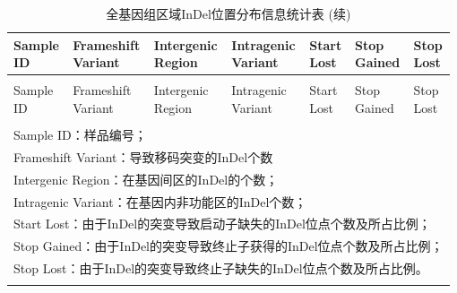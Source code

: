 \documentclass[
  a4paper,
  titlepage]{article}
\begin{document}
\begin{longtable}[t]{lllllll}
\caption{\label{tab:indelannostat-table}全基因组区域InDel位置分布信息统计表}\\
\toprule
\makecell[c]{Sample\\ID} & \makecell[c]{Frameshift\\Variant} & \makecell[c]{Intergenic\\Region} & \makecell[c]{Intragenic\\Variant} & \makecell[c]{Start\\Lost} & \makecell[c]{Stop\\Gained} & \makecell[c]{Stop\\Lost}\\
\midrule
\endfirsthead
\caption[]{\label{tab:indelannostat-table}全基因组区域InDel位置分布信息统计表 (续)}\\
\toprule
\makecell[c]{Sample\\ID} & \makecell[c]{Frameshift\\Variant} & \makecell[c]{Intergenic\\Region} & \makecell[c]{Intragenic\\Variant} & \makecell[c]{Start\\Lost} & \makecell[c]{Stop\\Gained} & \makecell[c]{Stop\\Lost}\\
\midrule
\endhead
\hline
\endfoot
\bottomrule
\multicolumn{7}{l}{\rule{0pt}{1em}\textit{注：}}\\
\multicolumn{7}{l}{\rule{0pt}{1em}Sample ID：样品编号；}\\
\multicolumn{7}{l}{\rule{0pt}{1em}Frameshift Variant：导致移码突变的InDel个数}\\
\multicolumn{7}{l}{\rule{0pt}{1em}Intergenic Region：在基因间区的InDel的个数；}\\
\multicolumn{7}{l}{\rule{0pt}{1em}Intragenic Variant：在基因内非功能区的InDel个数；}\\
\multicolumn{7}{l}{\rule{0pt}{1em}Start Lost：由于InDel的突变导致启动子缺失的InDel位点个数及所占比例；}\\
\multicolumn{7}{l}{\rule{0pt}{1em}Stop Gained：由于InDel的突变导致终止子获得的InDel位点个数及所占比例；}\\
\multicolumn{7}{l}{\rule{0pt}{1em}Stop Lost：由于InDel的突变导致终止子缺失的InDel位点个数及所占比例。}\\
\endlastfoot
\cellcolor{gray!6}{FJMS} & \cellcolor{gray!6}{6,431} & \cellcolor{gray!6}{397,716} & \cellcolor{gray!6}{0} & \cellcolor{gray!6}{89} & \cellcolor{gray!6}{186} & \cellcolor{gray!6}{72}\\
 

\end{longtable}
\end{document}
